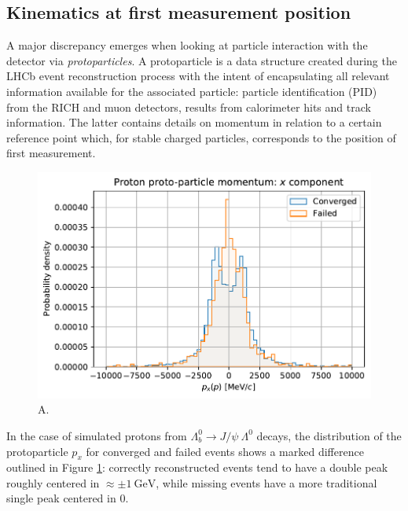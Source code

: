 \subsection{Kinematics at first measurement position}
\label{sec:3:kinematics_at_first_meas}
A major discrepancy emerges when looking at particle interaction with the detector via \textit{protoparticles}.
A protoparticle is a data structure created during the LHCb event reconstruction process with the intent of encapsulating all relevant information available for the associated particle:
particle identification (PID) from the RICH and muon detectors, results from calorimeter hits and track information.
The latter contains details on momentum in relation to a certain reference point which, for stable charged particles, corresponds to the position of first measurement.

\begin{figure}[t]
	\centering
	\includegraphics[width=.6\textwidth]{graphics/03-vertex_reconstruction/pp_p_momentum_x.pdf}
	\caption{A.}
	\label{fig:pp_p_px_conv_vs_failed}
\end{figure}

In the case of simulated protons from $\Lambda_b^0 \rightarrow J/\psi~\Lambda^0$ decays, the distribution of the
protoparticle $p_x$ for converged and failed events shows a marked difference outlined in Figure \ref{fig:pp_p_px_conv_vs_failed}:
correctly reconstructed events tend to have a double peak roughly centered in $\approx \pm \SI{1}{\giga\electronvolt}$, while missing events have a more traditional single peak centered in $0$.

